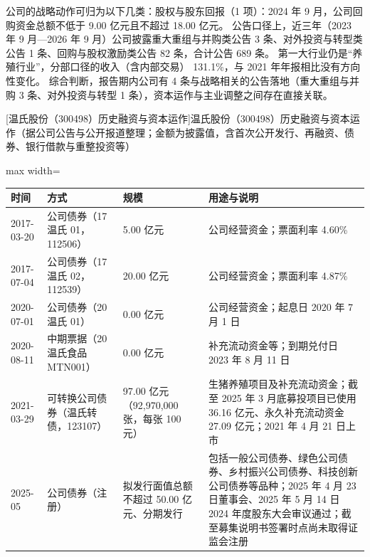  公司的战略动作可归为以下几类：股权与股东回报（1 项）：2024 年 9 月，公司回购资金总额不低于 9.00 亿元且不超过 18.00 亿元。 公告口径上，近三年（2023 年 9 月---2026 年 9 月）公司披露重大重组与并购类公告 3 条、对外投资与转型类公告 1 条、回购与股权激励类公告 82 条，合计公告 689 条。 第一大行业仍是“养殖行业”，分部口径的收入（含内部交易） 131.1\%，与 2021 年年报相比没有方向性变化。 综合判断，报告期内公司有 4 条与战略相关的公告落地（重大重组与并购 3 条、对外投资与转型 1 条），资本运作与主业调整之间存在直接关联。

\begin{center}\small\setlength{\tabcolsep}{4pt}
[温氏股份（300498）历史融资与资本运作]{温氏股份（300498）历史融资与资本运作（据公司公告与公开报道整理；金额为披露值，含首次公开发行、再融资、债券、银行借款与重整投资等）}
\begin{adjustbox}{max width=\textwidth}
\begin{tabular}{@{}p{1.45cm}p{2.55cm}p{4.05cm}p{4.95cm}@{}}
\toprule
时间 & 方式 & 规模 & 用途与说明 \\
\midrule
2017-03-20 & 公司债券（17 温氏 01，112506） & 5.00 亿元 & 公司经营资金；票面利率 4.60\% \\
2017-07-04 & 公司债券（17 温氏 02，112539） & 20.00 亿元 & 公司经营资金；票面利率 4.87\% \\
2020-07-01 & 公司债券（20 温氏 01） & 0.00 亿元 & 公司经营资金；起息日 2020 年 7 月 1 日 \\
2020-08-11 & 中期票据（20 温氏食品 MTN001） & 0.00 亿元 & 补充流动资金等；到期兑付日 2023 年 8 月 11 日 \\
2021-03-29 & 可转换公司债券（温氏转债，123107） & 97.00 亿元（92,\allowbreak{}970,\allowbreak{}000 张，\allowbreak{}每张 100 元） & 生猪养殖项目及补充流动资金；截至 2025 年 3 月底募投项目已使用 36.16 亿元、\allowbreak{}永久补充流动资金 27.09 亿元；2021 年 4 月 21 日上市 \\
2025-05 & 公司债券（注册） & 拟发行面值总额不超过 50.00 亿元、\allowbreak{}分期发行 & 包括一般公司债券、\allowbreak{}绿色公司债券、\allowbreak{}乡村振兴公司债券、\allowbreak{}科技创新公司债券等品种；2025 年 4 月 23 日董事会、\allowbreak{}2025 年 5 月 14 日 2024 年度股东大会审议通过；截至募集说明书签署时点尚未取得证监会注册 \\
\bottomrule
\end{tabular}
\end{adjustbox}
\end{center}

